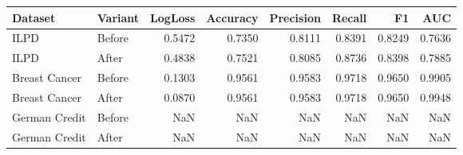 \begin{tabular}{llrrrrrr}
\toprule
Dataset & Variant & LogLoss & Accuracy & Precision & Recall & F1 & AUC \\
\midrule
ILPD & Before & 0.5472 & 0.7350 & 0.8111 & 0.8391 & 0.8249 & 0.7636 \\
ILPD & After & 0.4838 & 0.7521 & 0.8085 & 0.8736 & 0.8398 & 0.7885 \\
Breast Cancer & Before & 0.1303 & 0.9561 & 0.9583 & 0.9718 & 0.9650 & 0.9905 \\
Breast Cancer & After & 0.0870 & 0.9561 & 0.9583 & 0.9718 & 0.9650 & 0.9948 \\
German Credit & Before & NaN & NaN & NaN & NaN & NaN & NaN \\
German Credit & After & NaN & NaN & NaN & NaN & NaN & NaN \\
\bottomrule
\end{tabular}
